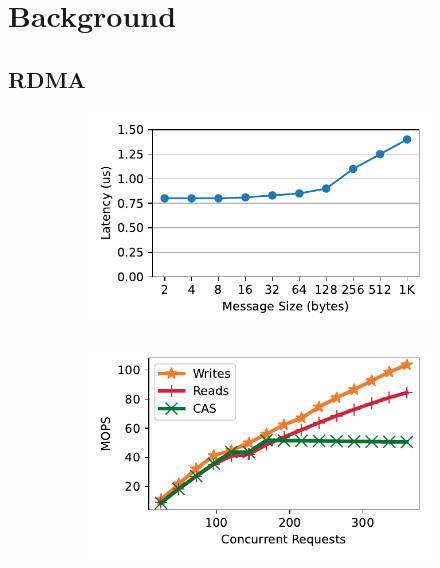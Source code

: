 \section{Background}
\label{sec:background}

\subsection{RDMA}

\begin{figure}[t]
    \centering
    \begin{subfigure}{0.3\linewidth}
        \includegraphics[width=0.99\linewidth]{fig/rdma_latency.pdf}
    \end{subfigure}
    \begin{subfigure}{0.3\linewidth}
        \includegraphics[width=0.99\linewidth]{fig/rdma_concur.pdf}
    \end{subfigure}

\end{figure}

